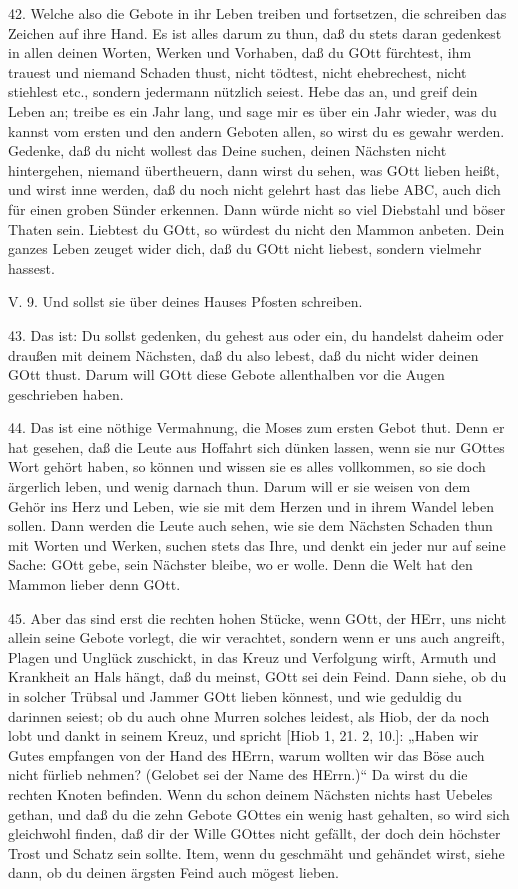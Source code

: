 42. Welche also die Gebote in ihr Leben treiben und fortsetzen, die schreiben das Zeichen auf ihre Hand. Es ist alles darum zu thun, daß du stets daran gedenkest in allen deinen Worten, Werken und Vorhaben, daß du GOtt fürchtest, ihm trauest und niemand Schaden thust, nicht tödtest, nicht ehebrechest, nicht stiehlest etc., sondern jedermann nützlich seiest. Hebe das an, und greif dein Leben an; treibe es ein Jahr lang, und sage mir es über ein Jahr wieder, was du kannst vom ersten und den andern Geboten allen, so wirst du es gewahr werden. Gedenke, daß du nicht wollest das Deine suchen, deinen Nächsten nicht hintergehen, niemand übertheuern, dann wirst du sehen, was GOtt lieben heißt, und wirst inne werden, daß du noch nicht
gelehrt hast das liebe ABC, auch dich für einen groben Sünder erkennen. Dann würde nicht so viel Diebstahl und böser Thaten sein. Liebtest du GOtt, so würdest du nicht den Mammon anbeten. Dein ganzes Leben zeuget wider dich, daß du GOtt nicht liebest, sondern vielmehr hassest.

\begin{schriftzitat}
V. 9. Und sollst sie über deines Hauses Pfosten schreiben.
\end{schriftzitat}

43. Das ist: Du sollst gedenken, du gehest aus oder ein, du handelst daheim oder draußen mit deinem Nächsten, daß du also lebest, daß du nicht wider deinen GOtt thust. Darum will GOtt diese Gebote allenthalben vor die Augen geschrieben haben.

44. Das ist eine nöthige Vermahnung, die Moses zum ersten Gebot thut. Denn er hat gesehen, daß die Leute aus Hoffahrt sich dünken lassen, wenn sie nur GOttes Wort gehört haben, so können und wissen sie es alles vollkommen, so sie doch ärgerlich leben, und wenig darnach thun. Darum will er sie weisen von dem Gehör ins Herz und Leben, wie sie mit dem Herzen und in ihrem Wandel leben sollen. Dann werden die Leute auch sehen, wie sie dem Nächsten Schaden thun mit Worten und Werken, suchen stets das Ihre, und denkt ein jeder nur auf seine Sache: GOtt gebe, sein Nächster bleibe, wo er wolle. Denn die Welt hat den Mammon lieber denn GOtt.

45. Aber das sind erst die rechten hohen Stücke, wenn GOtt, der HErr, uns nicht allein seine Gebote vorlegt, die wir verachtet, sondern wenn er uns auch angreift, Plagen und Unglück zuschickt, in das Kreuz und Verfolgung wirft, Armuth und Krankheit an Hals hängt, daß du meinst, GOtt sei dein Feind. Dann siehe, ob du in solcher Trübsal und Jammer GOtt lieben könnest, und wie geduldig du darinnen seiest; ob du auch ohne Murren solches leidest, als Hiob, der da noch lobt und dankt in seinem Kreuz, und spricht [Hiob 1, 21. 2, 10.]: „Haben wir Gutes empfangen von der Hand des HErrn, warum wollten wir das Böse auch nicht fürlieb nehmen? (Gelobet sei der Name des HErrn.)“ Da wirst du die rechten Knoten befinden. Wenn du schon deinem Nächsten nichts hast Uebeles gethan, und daß du die zehn Gebote GOttes ein wenig hast gehalten, so wird sich gleichwohl finden, daß dir der Wille GOttes nicht gefällt, der doch dein höchster Trost und Schatz sein sollte. Item, wenn du geschmäht und gehändet wirst, siehe dann, ob du deinen ärgsten Feind auch mögest lieben.

